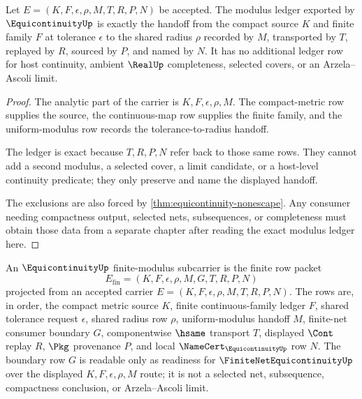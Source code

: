 \begin{theorem}
\label{thm:equicontinuity-modulus-ledger-exactness}
Let $E=(K,F,\epsilon,\rho,M,T,R,P,N)$ be accepted. The modulus ledger exported by $\EquicontinuityUp$ is exactly the handoff from the compact source $K$ and finite family $F$ at tolerance $\epsilon$ to the shared radius $\rho$ recorded by $M$, transported by $T$, replayed by $R$, sourced by $P$, and named by $N$. It has no additional ledger row for host continuity, ambient $\RealUp$ completeness, selected covers, or an Arzela--Ascoli limit.
\end{theorem}
\begin{proof}
The analytic part of the carrier is $K,F,\epsilon,\rho,M$. The compact-metric row supplies the source, the continuous-map row supplies the finite family, and the uniform-modulus row records the tolerance-to-radius handoff.

The ledger is exact because $T,R,P,N$ refer back to those same rows. They cannot add a second modulus, a selected cover, a limit candidate, or a host-level continuity predicate; they only preserve and name the displayed handoff.

The exclusions are also forced by \autoref{thm:equicontinuity-nonescape}. Any consumer needing compactness output, selected nets, subsequences, or completeness must obtain those data from a separate chapter after reading the exact modulus ledger here.
\end{proof}

\begin{definition}
\label{def:equicontinuity-finite-modulus-carrier}
An $\EquicontinuityUp$ finite-modulus subcarrier is the finite row packet
$$
E_{\mathrm{fin}}=(K,F,\epsilon,\rho,M,G,T,R,P,N)
$$
projected from an accepted carrier $E=(K,F,\epsilon,\rho,M,T,R,P,N)$. The rows are, in order, the compact metric source $K$, finite continuous-family ledger $F$, shared tolerance request $\epsilon$, shared radius row $\rho$, uniform-modulus handoff $M$, finite-net consumer boundary $G$, componentwise $\hsame$ transport $T$, displayed $\Cont$ replay $R$, $\Pkg$ provenance $P$, and local $\NameCert_{\EquicontinuityUp}$ row $N$. The boundary row $G$ is readable only as readiness for $\FiniteNetEquicontinuityUp$ over the displayed $K,F,\epsilon,\rho,M$ route; it is not a selected net, subsequence, compactness conclusion, or Arzela--Ascoli limit.
\end{definition}


